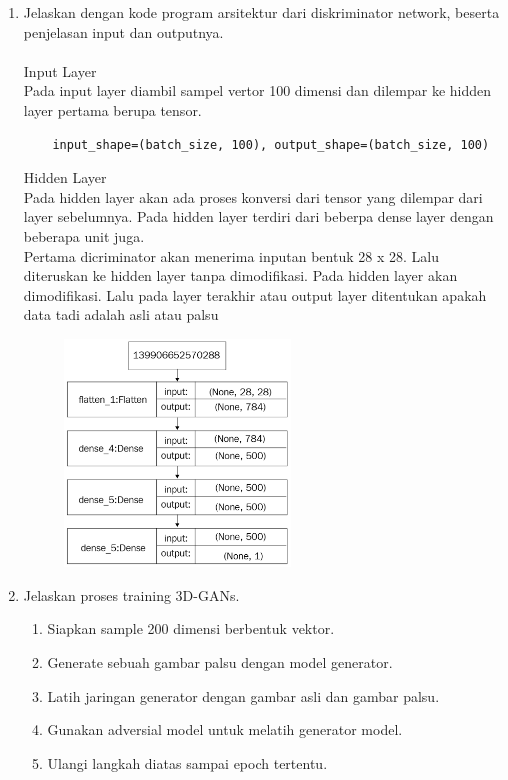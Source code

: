\begin{enumerate}
	\item Jelaskan dengan kode program arsitektur dari diskriminator network, beserta penjelasan input dan outputnya.
	\\ \\
	Input Layer\\
	Pada input layer diambil sampel vertor 100 dimensi dan dilempar ke hidden layer pertama berupa tensor.\\
	\begin{lstlisting}
	input_shape=(batch_size, 100), output_shape=(batch_size, 100)
	\end{lstlisting}
	Hidden Layer\\
	Pada hidden layer akan ada proses konversi dari tensor yang dilempar dari layer sebelumnya. Pada hidden layer terdiri dari beberpa dense layer dengan beberapa unit juga.\\
	Pertama dicriminator akan menerima inputan bentuk 28 x 28. Lalu diteruskan ke hidden layer tanpa dimodifikasi. Pada hidden layer akan dimodifikasi. Lalu pada layer terakhir atau output layer ditentukan apakah data tadi adalah asli atau palsu
	\begin{figure}[H]
		\includegraphics[width=6cm]{figures/1174006/chapter8/teori/arc2.png}
		\centering
	\end{figure}
	\item Jelaskan proses training 3D-GANs.
	\begin{enumerate}
		\item Siapkan sample 200 dimensi berbentuk vektor.
		\item Generate sebuah gambar palsu dengan model generator.
		\item Latih jaringan generator dengan gambar asli dan gambar palsu.
		\item Gunakan adversial model untuk melatih generator model.
		\item Ulangi langkah diatas sampai epoch tertentu.
		

\end{enumerate}
\end{enumerate}
